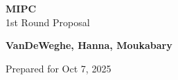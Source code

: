 \begin{titlepage}
    \begin{center}
    {\fontsize{40}{48}\selectfont \bfseries MIPC} 
    \\\vspace{20pt}
    {\LARGE 1st Round Proposal} \\
    \vspace{20pt}
    
    \vfill %


        \vfill %
        \textbf{VanDeWeghe, Hanna, Moukabary}

        Prepared for Oct 7, 2025
    \end{center}
\end{titlepage}